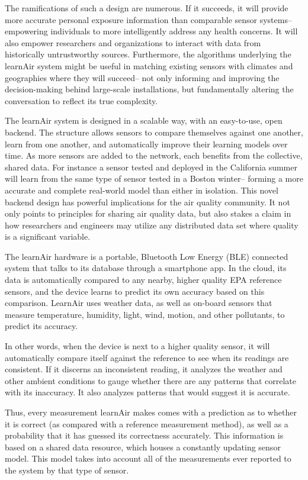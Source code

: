 The ramifications of such a design are numerous. If it succeeds, it will provide more accurate personal exposure information than comparable sensor systems-- empowering individuals to more intelligently address any health concerns.  It will also empower researchers and organizations to interact with data from historically untrustworthy sources.  Furthermore, the algorithms underlying the learnAir system might be useful in matching existing sensors with climates and geographies where they will succeed-- not only informing and improving the decision-making behind large-scale installations, but fundamentally altering the conversation to reflect its true complexity.  

The learnAir system is designed in a scalable way, with an easy-to-use, open backend.  The structure allows sensors to compare themselves against one another, learn from one another, and automatically improve their learning models over time.  As more sensors are added to the network, each benefits from the collective, shared data.  For instance a sensor tested and deployed in the California summer will learn from the same type of sensor tested in a Boston winter-- forming a more accurate and complete real-world model than either in isolation.  This novel backend design has powerful implications for the air quality community.  It not only points to principles for sharing air quality data, but also stakes a claim in how researchers and engineers may utilize any distributed data set where quality is a significant variable.
 
The learnAir hardware is a portable, Bluetooth Low Energy (BLE) connected system that talks to its database through a smartphone app.  In the cloud, its data is automatically compared to any nearby, higher quality EPA reference sensors, and the device learns to predict its own accuracy based on this comparison.  LearnAir uses weather data, as well as on-board sensors that measure temperature, humidity, light, wind, motion, and other pollutants, to predict its accuracy.  

In other words, when the device is next to a higher quality sensor, it will automatically compare itself against the reference to see when its readings are consistent.  If it discerns an inconsistent reading, it analyzes the weather and other ambient conditions to gauge whether there are any patterns that correlate with its inaccuracy.  It also analyzes patterns that would suggest it is accurate.

Thus, every measurement learnAir makes comes with a prediction as to whether it is correct (as compared with a reference measurement method), as well as a probability that it has guessed its correctness accurately.  This information is based on a shared data resource, which houses a constantly updating sensor model.  This model takes into account all of the measurements ever reported to the system by that type of sensor.   

